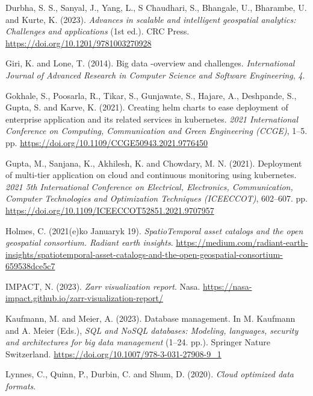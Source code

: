 \documentclass[
  oneside,
  open=any]{scrbook}
\newlength{\cslhangindent}
\newenvironment{CSLReferences}[2] %
 {\begin{list}{}{%
  \setlength{\itemindent}{0pt}
  \setlength{\leftmargin}{0pt}
  \setlength{\parsep}{0pt}
  \ifodd #1
   \setlength{\leftmargin}{\cslhangindent}
   \setlength{\itemindent}{-1\cslhangindent}
  \fi
  \setlength{\itemsep}{#2\baselineskip}}}
 {\end{list}}
\begin{document}
\begin{CSLReferences}{1}{0}
Durbha, S. S., Sanyal, J., Yang, L., S Chaudhari, S., Bhangale, U.,
Bharambe, U. and Kurte, K. (2023). \emph{Advances in scalable and
intelligent geospatial analytics: Challenges and applications} (1st
ed.). {CRC} Press. \url{https://doi.org/10.1201/9781003270928}

Giri, K. and Lone, T. (2014). Big data -overview and challenges.
\emph{International Journal of Advanced Research in Computer Science and
Software Engineering}, \emph{4}.

Gokhale, S., Poosarla, R., Tikar, S., Gunjawate, S., Hajare, A.,
Deshpande, S., Gupta, S. and Karve, K. (2021). Creating helm charts to
ease deployment of enterprise application and its related services in
kubernetes. \emph{2021 International Conference on Computing,
Communication and Green Engineering ({CCGE})}, 1--5. pp.
\url{https://doi.org/10.1109/CCGE50943.2021.9776450}

Gupta, M., Sanjana, K., Akhilesh, K. and Chowdary, M. N. (2021).
Deployment of multi-tier application on cloud and continuous monitoring
using kubernetes. \emph{2021 5th International Conference on Electrical,
Electronics, Communication, Computer Technologies and Optimization
Techniques ({ICEECCOT})}, 602--607. pp.
\url{https://doi.org/10.1109/ICEECCOT52851.2021.9707957}

Holmes, C. (2021(e)ko Januaryk 19). \emph{{SpatioTemporal} asset
catalogs and the open geospatial consortium. Radiant earth insights}.
\url{https://medium.com/radiant-earth-insights/spatiotemporal-asset-catalogs-and-the-open-geospatial-consortium-659538dce5c7}

IMPACT, N. (2023). \emph{Zarr visualization report}. Nasa.
\url{https://nasa-impact.github.io/zarr-visualization-report/}

Kaufmann, M. and Meier, A. (2023). Database management. In M. Kaufmann
and A. Meier (Eds.), \emph{{SQL} and {NoSQL} databases: Modeling,
languages, security and architectures for big data management} (1--24.
pp.). Springer Nature Switzerland.
\url{https://doi.org/10.1007/978-3-031-27908-9_1}

Lynnes, C., Quinn, P., Durbin, C. and Shum, D. (2020). \emph{Cloud
optimized data formats}.


\end{CSLReferences}
\end{document}
